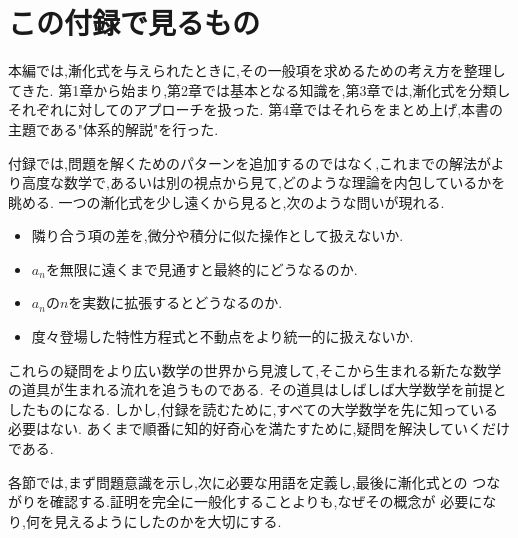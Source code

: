 \section{この付録で見るもの}

本編では,漸化式を与えられたときに,その一般項を求めるための考え方を整理してきた.
第1章から始まり,第2章では基本となる知識を,第3章では,漸化式を分類しそれぞれに対してのアプローチを扱った.
第4章ではそれらをまとめ上げ,本書の主題である"体系的解説"を行った.

付録では,問題を解くためのパターンを追加するのではなく,これまでの解法がより高度な数学で,あるいは別の視点から見て,どのような理論を内包しているかを眺める.
一つの漸化式を少し遠くから見ると,次のような問いが現れる.

\begin{itemize}
  \item 隣り合う項の差を,微分や積分に似た操作として扱えないか.
  \item $a_n$を無限に遠くまで見通すと最終的にどうなるのか.
  \item $a_n$の$n$を実数に拡張するとどうなるのか.
  \item 度々登場した特性方程式と不動点をより統一的に扱えないか.
\end{itemize}

これらの疑問をより広い数学の世界から見渡して,そこから生まれる新たな数学の道具が生まれる流れを追うものである.
その道具はしばしば大学数学を前提としたものになる.
しかし,付録を読むために,すべての大学数学を先に知っている必要はない.
あくまで順番に知的好奇心を満たすために,疑問を解決していくだけである.

各節では,まず問題意識を示し,次に必要な用語を定義し,最後に漸化式との
つながりを確認する.証明を完全に一般化することよりも,なぜその概念が
必要になり,何を見えるようにしたのかを大切にする.